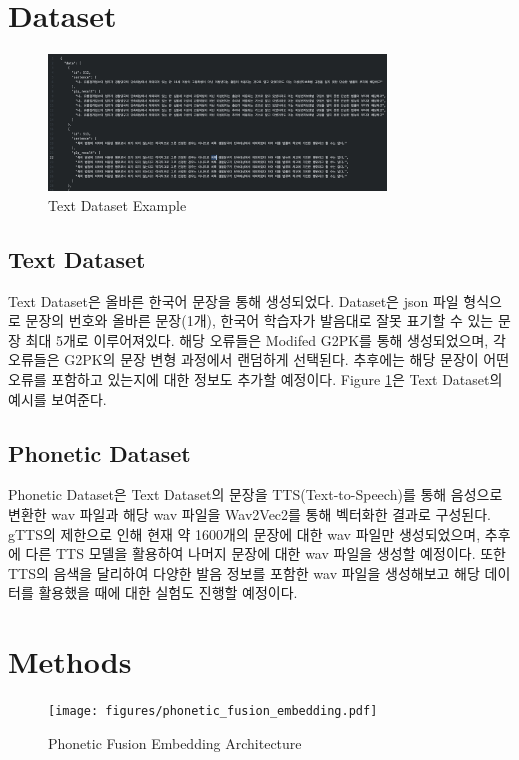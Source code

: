 \documentclass[letterpaper]{article} %
\begin{document}
\section{Dataset}
\begin{figure}[ht]
    \centering
    \includegraphics[width=0.8\textwidth]{figures/text_dataset_example.png}
    \caption{Text Dataset Example}
    \label{fig:text_dataset_example}
\end{figure}
\subsection{Text Dataset}
Text Dataset은 올바른 한국어 문장을 통해 생성되었다. Dataset은 json 파일 형식으로 문장의 번호와 올바른 문장(1개), 한국어 학습자가 발음대로 잘못 표기할 수 있는 문장 최대 5개로 이루어져있다. 해당 오류들은 Modifed G2PK를 통해 생성되었으며, 각 오류들은 G2PK의 문장 변형 과정에서 랜덤하게 선택된다. 추후에는 해당 문장이 어떤 오류를 포함하고 있는지에 대한 정보도 추가할 예정이다. Figure \ref{fig:text_dataset_example}은 Text Dataset의 예시를 보여준다.



\subsection{Phonetic Dataset}
Phonetic Dataset은 Text Dataset의 문장을 TTS(Text-to-Speech)를 통해 음성으로 변환한 wav 파일과 해당 wav 파일을 Wav2Vec2를 통해 벡터화한 결과로 구성된다.
gTTS의 제한으로 인해 현재 약 1600개의 문장에 대한 wav 파일만 생성되었으며, 추후에 다른 TTS 모델을 활용하여 나머지 문장에 대한 wav 파일을 생성할 예정이다.
또한 TTS의 음색을 달리하여 다양한 발음 정보를 포함한 wav 파일을 생성해보고 해당 데이터를 활용했을 때에 대한 실험도 진행할 예정이다.

\section{Methods}

\begin{figure}[ht]
    \centering
    \texttt{[image: figures/phonetic\_fusion\_embedding.pdf]}
    \caption{Phonetic Fusion Embedding Architecture}
    \label{fig:phonetic_encoder}
\end{figure}
\end{document}
